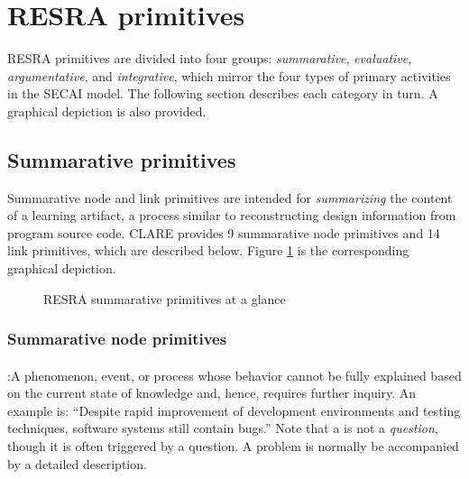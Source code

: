 \section{RESRA primitives}
\label{sec:resra-primitives}

RESRA primitives are divided into four groups: {\it summarative\/}, {\it
evaluative\/}, {\it argumentative\/}, and {\it integrative\/}, which mirror
the four types of primary activities in the SECAI model. The following
section describes each category in turn. A graphical depiction is also
provided.


\subsection{Summarative primitives}
\label{sec:summarative primitives}

Summarative node and link primitives are intended for {\it summarizing\/}
the content of a learning artifact, a process similar to reconstructing
design information from program source code. CLARE provides 9 summarative
node primitives and 14 link primitives, which are described below. Figure
\ref{fig:sum-resra} is the corresponding graphical depiction.

\begin{figure}[htb]
  \caption{RESRA summarative primitives at a glance}
  \label{fig:sum-resra}
\end{figure}


\subsubsection{Summarative node primitives}

\paragraph{}

\noindent{}:\hspace{.2in}A phenomenon, event, or process
whose behavior cannot be fully explained based on the current state of
knowledge and, hence, requires further inquiry. An example  is: ``Despite rapid improvement of development environments
and testing techniques, software systems still contain bugs.''  Note that a
 is not a {\it question\/}, though it is often
triggered by a question. A problem is normally be accompanied by a detailed
description.

